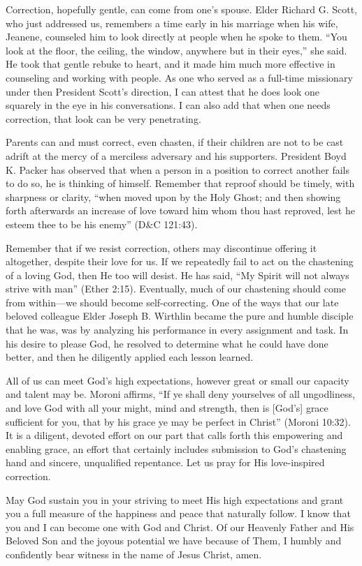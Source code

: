\documentclass[letterpaper, 11pt]{report}
\begin{document}
Correction, hopefully gentle, can come from one’s spouse. Elder Richard G. Scott, who just addressed us, remembers a time early in his marriage when his wife, Jeanene, counseled him to look directly at people when he spoke to them. “You look at the floor, the ceiling, the window, anywhere but in their eyes,” she said. He took that gentle rebuke to heart, and it made him much more effective in counseling and working with people. As one who served as a full-time missionary under then President Scott’s direction, I can attest that he does look one squarely in the eye in his conversations. I can also add that when one needs correction, that look can be very penetrating.

Parents can and must correct, even chasten, if their children are not to be cast adrift at the mercy of a merciless adversary and his supporters. President Boyd K. Packer has observed that when a person in a position to correct another fails to do so, he is thinking of himself. Remember that reproof should be timely, with sharpness or clarity, “when moved upon by the Holy Ghost; and then showing forth afterwards an increase of love toward him whom thou hast reproved, lest he esteem thee to be his enemy” (D\&C 121:43).

Remember that if we resist correction, others may discontinue offering it altogether, despite their love for us. If we repeatedly fail to act on the chastening of a loving God, then He too will desist. He has said, “My Spirit will not always strive with man” (Ether 2:15). Eventually, much of our chastening should come from within—we should become self-correcting. One of the ways that our late beloved colleague Elder Joseph B. Wirthlin became the pure and humble disciple that he was, was by analyzing his performance in every assignment and task. In his desire to please God, he resolved to determine what he could have done better, and then he diligently applied each lesson learned.

All of us can meet God’s high expectations, however great or small our capacity and talent may be. Moroni affirms, “If ye shall deny yourselves of all ungodliness, and love God with all your might, mind and strength, then is [God’s] grace sufficient for you, that by his grace ye may be perfect in Christ” (Moroni 10:32). It is a diligent, devoted effort on our part that calls forth this empowering and enabling grace, an effort that certainly includes submission to God’s chastening hand and sincere, unqualified repentance. Let us pray for His love-inspired correction.

May God sustain you in your striving to meet His high expectations and grant you a full measure of the happiness and peace that naturally follow. I know that you and I can become one with God and Christ. Of our Heavenly Father and His Beloved Son and the joyous potential we have because of Them, I humbly and confidently bear witness in the name of Jesus Christ, amen.
\end{document}
